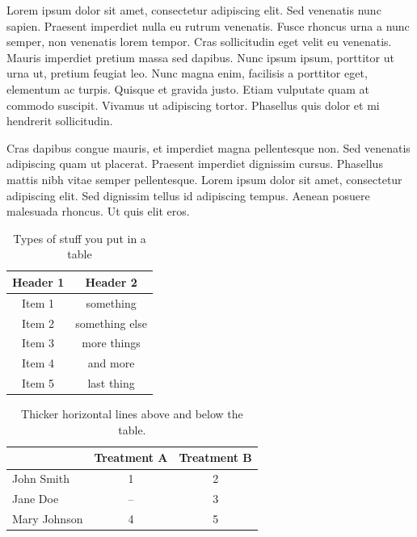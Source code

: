 \documentclass[double,12pt]{beavtex}
\begin{document}
Lorem ipsum dolor sit amet, consectetur adipiscing elit. Sed venenatis nunc sapien. Praesent imperdiet nulla eu rutrum venenatis. Fusce rhoncus urna a nunc semper, non venenatis lorem tempor. Cras sollicitudin eget velit eu venenatis. Mauris imperdiet pretium massa sed dapibus. Nunc ipsum ipsum, porttitor ut urna ut, pretium feugiat leo. Nunc magna enim, facilisis a porttitor eget, elementum ac turpis. Quisque et gravida justo. Etiam vulputate quam at commodo suscipit. Vivamus ut adipiscing tortor. Phasellus quis dolor et mi hendrerit sollicitudin. 

Cras dapibus congue mauris, et imperdiet magna pellentesque non. Sed venenatis adipiscing quam ut placerat. Praesent imperdiet dignissim cursus. Phasellus mattis nibh vitae semper pellentesque. Lorem ipsum dolor sit amet, consectetur adipiscing elit. Sed dignissim tellus id adipiscing tempus. Aenean posuere malesuada rhoncus. Ut quis elit eros.


\begin{table}[ht]
\caption{Types of stuff you put in a table} %
\centering  %
\begin{tabular}{c c} %
\hline\hline                        %
Header 1 & Header 2 \\ [0.5ex] %
\hline                  %
Item 1 & something  \\ %
Item 2 & something else  \\
Item 3 & more things  \\
Item 4 & and more \\
Item 5 & last thing \\ [1ex]      %
\hline %
\end{tabular}
\label{table:misc} %
\end{table}


\begin{table}[ht]
\centering
\caption{Thicker horizontal lines above and below the table.}
\begin{tabular}[t]{lcc}
\toprule
&Treatment A&Treatment B\\
\midrule
John Smith&1&2\\
Jane Doe&--&3\\
Mary Johnson&4&5\\
\bottomrule
\end{tabular}
\end{table}%
\end{document}
